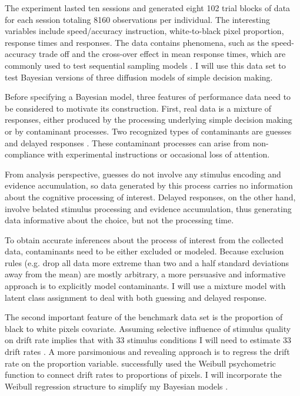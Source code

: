 \documentclass[12pt]{article}
\begin{document}
	The experiment lasted ten sessions and generated eight 102 trial blocks of data for each session totaling 8160 observations per individual. The interesting variables include speed/accuracy instruction, white-to-black pixel proportion, response times and responses. The data contains phenomena, such as the speed-accuracy trade off and the cross-over effect in mean response times, which are commonly used to test sequential sampling models \citep{RatMck2008}. I will use this data set to test Bayesian versions of three diffusion models of simple decision making.
    
	Before specifying a Bayesian model, three features of performance data need to be considered to motivate its construction. First, real data is a mixture of responses, either produced by the processing underlying simple decision making or by contaminant processes. Two recognized types of contaminants are guesses and delayed responses \citep{Rat1993,RatTue2002,VanTue2007,VanTue2008, VanTue2011,CraPer2010}. These contaminant processes can arise from non-compliance with experimental instructions or occasional loss of attention.  
    
	From analysis perspective, guesses do not involve any stimulus encoding and evidence accumulation, so data generated by this process carries no information about the cognitive processing of interest. Delayed responses, on the other hand, involve belated stimulus processing and evidence accumulation, thus generating data informative about the choice, but not the processing time. 
    
	To obtain accurate inferences about the process of interest from the collected data, contaminants need to be either excluded or modeled. Because exclusion rules (e.g. drop all data more extreme than two and a half standard deviations away from the mean) are mostly arbitrary, a more persuasive and informative approach is to explicitly model contaminants. I will use a mixture model with latent class assignment to deal with both guessing and delayed response.
    
	The second important feature of the benchmark data set is the proportion of black to white pixels covariate. Assuming selective influence of stimulus quality on drift rate implies that with 33 stimulus conditions I will need to estimate 33 drift rates \citep{VosRot2004}. A more parsimonious and revealing approach is to regress the drift rate on the proportion variable. \citet{VanTue2008,VanTue2011} successfully used the Weibull psychometric function to connect drift rates to proportions of pixels. I will incorporate the Weibull regression structure to simplify my Bayesian models \citep{PerVan2002,Rat2014}. 
    
\end{document}
